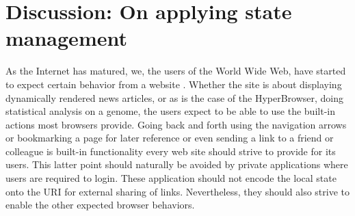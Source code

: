 \documentclass[english]{ifimaster}
\begin{document}




\chapter{Discussion: On applying state management}
As the Internet has matured, we, the users of the World Wide Web, have started to expect certain behavior from a website \parencite[p.85]{mikowski}. Whether the site is about displaying dynamically rendered news articles, or as is the case of the HyperBrowser, doing statistical analysis on a genome, the users expect to be able to use the built-in actions most browsers provide. Going back and forth using the navigation arrows or bookmarking a page for later reference or even sending a link to a friend or colleague is built-in functionality every web site should strive to provide for its users. This latter point should naturally be avoided by private applications where users are required to login. These application should not encode the local state onto the URI for external sharing of links. Nevertheless, they should also strive to enable the other expected browser behaviors.
\end{document}
